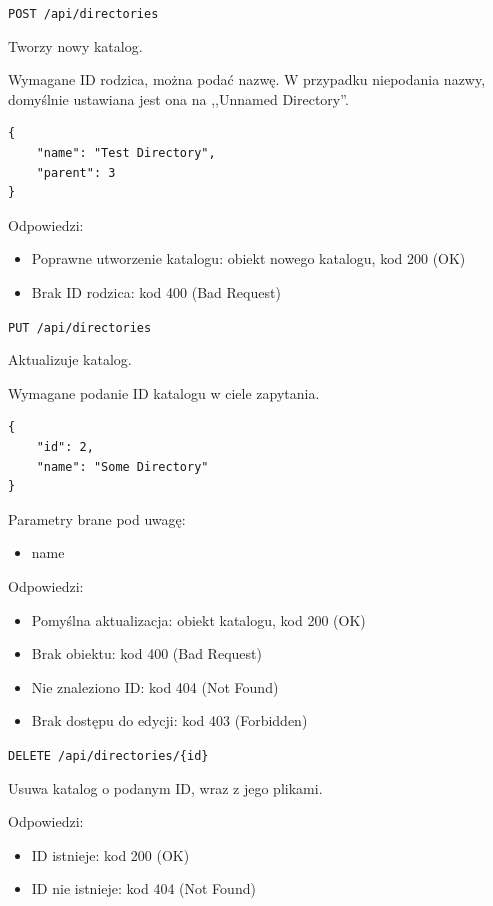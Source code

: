 \documentclass[a4paper,twoside,12pt]{book}
\begin{document}
\label{create-directory}

\texttt{POST\ /api/directories}

Tworzy nowy katalog.

Wymagane ID rodzica, można podać nazwę. W przypadku niepodania nazwy, domyślnie ustawiana jest ona na ,,Unnamed Directory''.

\begin{verbatim}
{
    "name": "Test Directory",
    "parent": 3
}
\end{verbatim}

Odpowiedzi: 
\begin{itemize}
	\item Poprawne utworzenie katalogu: obiekt nowego katalogu, kod 200 (OK) 
	\item Brak ID rodzica: kod 400 (Bad Request)
\end{itemize}

\label{update-directory}

\texttt{PUT\ /api/directories}

Aktualizuje katalog.

Wymagane podanie ID katalogu w ciele zapytania.

\begin{verbatim}
{
    "id": 2,
    "name": "Some Directory"
}
\end{verbatim}

Parametry brane pod uwagę: 
\begin{itemize}
	\item  name
\end{itemize}

Odpowiedzi: 
\begin{itemize}
	\item Pomyślna aktualizacja: obiekt katalogu, kod 200 (OK)
	\item Brak obiektu: kod 400 (Bad Request) 
	\item Nie znaleziono ID: kod 404 (Not Found) 
	\item Brak dostępu do edycji: kod 403 (Forbidden)
\end{itemize}

\label{delete-directory}

\texttt{DELETE\ /api/directories/\{id\}}

Usuwa katalog o podanym ID, wraz z jego plikami.

Odpowiedzi: 
\begin{itemize}
	\item ID istnieje: kod 200 (OK) 
	\item ID nie istnieje: kod 404 (Not Found)
\end{itemize}
\end{document}
